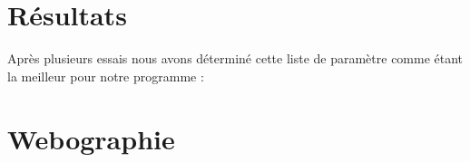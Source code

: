 \documentclass[12pt]{report}
\begin{document}
\section{Résultats}
	Après plusieurs essais nous avons déterminé cette liste de paramètre comme étant la meilleur pour notre programme :\\
\newpage
\section{Webographie}
\end{document}
